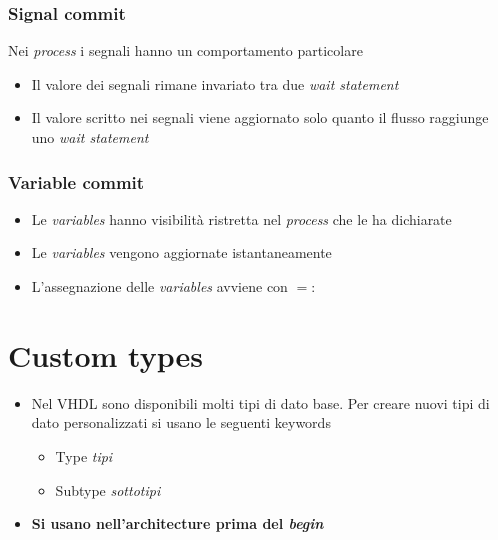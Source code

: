 \documentclass{article}
\begin{document}
\subsubsection{Signal commit}
Nei \textit{process} i segnali hanno un comportamento particolare
\begin{itemize}
  \item Il valore dei segnali rimane invariato tra due \textit{wait statement}
  \item Il valore scritto nei segnali viene aggiornato solo quanto il flusso raggiunge uno \textit{wait statement}
\end{itemize}
\subsubsection{Variable commit}
\begin{itemize}
  \item Le \textit{variables} hanno visibilità ristretta nel \textit{process} che le ha dichiarate
  \item Le \textit{variables} vengono aggiornate istantaneamente
  \item L'assegnazione delle \textit{variables} avviene con \(=:\)
\end{itemize}

\newpage

\section{Custom types}
\begin{itemize}
  \item Nel VHDL sono disponibili molti tipi di dato base. Per creare nuovi tipi di dato personalizzati si usano le seguenti keywords
        \begin{itemize}
          \item Type \textit{tipi}
          \item Subtype \textit{sottotipi}
        \end{itemize}
  \item \textbf{Si usano nell'architecture prima del \textit{begin}}
\end{itemize}
\end{document}
